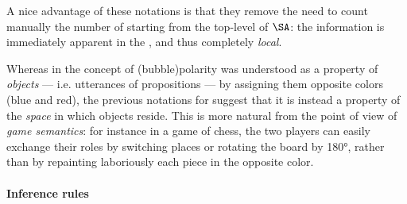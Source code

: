 \begin{scope}
A nice advantage of these notations is that they remove the need to count
manually the number of  starting from the top-level of $\SA$: the
information is immediately apparent in the , and thus completely
\emph{local}.

\begin{remark}
  Whereas in  the concept of \kl(bubble){polarity} was
  understood as a property of \emph{objects} --- i.e. utterances of propositions
  --- by assigning them opposite colors (blue and red), the previous notations
  for  suggest that it is instead a property of the \emph{space} in
  which objects reside. This is more natural from the point of view of
  \emph{game semantics}: for instance in a game of chess, the two players can
  easily exchange their roles by switching places or rotating the board by 180°,
  rather than by repainting laboriously each piece in the opposite color.
\end{remark}

\paragraph{Inference rules}


\end{scope}

